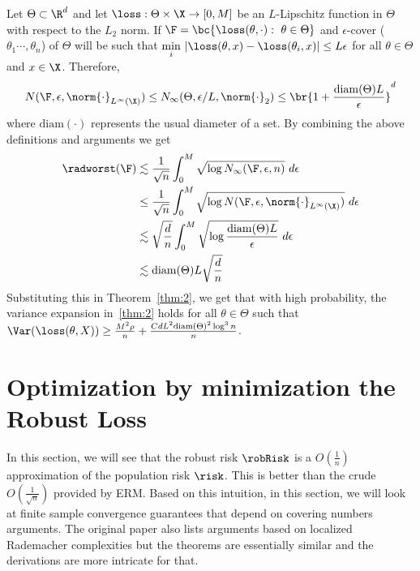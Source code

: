 \begin{example}
      Let $\Theta\subset\R^d$ and let
      $\loss:\Theta\times\X\rightarrow[0,M]$ be an $L$-Lipschitz function in
      $\Theta$ with respect to the $L_2$ norm. If
      $\F = \bc{\loss(\theta,\cdot):~\theta\in\Theta}$ and
      $\epsilon$-cover ($\theta_1\cdots,\theta_n$) of $\Theta$ will be
      such that
      $\underset{i}{\min}~|\loss(\theta, x) -
      \loss(\theta_i,x)|\le L\epsilon$ for all $\theta\in\Theta$ and
      $x\in\X$. Therefore,
      \[N(\F, \epsilon, \norm{\cdot}_{L^{\infty}(\X)} )\le
        N_{\infty}(\Theta,\epsilon/L, \norm{\cdot}_2)\le\br{1 +
          \frac{\mathrm{diam}(\Theta)L}{\epsilon}}^d\] where
      $\mathrm{diam}(\cdot)$ represents the usual diameter of a
      set. By combining the above definitions and arguments we get
      \begin{align*}
        \radworst(\F) &\lesssim
                        \frac{1}{\sqrt{n}}\int_{0}^M\sqrt{\log N_{\infty}(\F,\epsilon,n)}~d\epsilon\\
                      &\le \frac{1}{\sqrt{n}}\int_{0}^M\sqrt{\log N(\F,
                        \epsilon, \norm{\cdot}_{L^{\infty}(\X)}
                    )}~d\epsilon\\
                      &\lesssim
                        \sqrt{\frac{d}{n}} \int_{0}^M \sqrt{\log
                        \frac{\mathrm{diam} (\Theta)L}{\epsilon}}~d\epsilon\\
                      & \lesssim \mathrm{diam}(\Theta)L\sqrt{\frac{d}{n}}
      \end{align*}
      Substituting this in Theorem~\ref{thm:2}, we get that with high
      probability, the variance expansion in~\eqref{thm:2} holds for
      all $\theta\in\Theta$ such that
      $\Var(\loss(\theta, X))\ge \frac{M^2\rho}{n}+
      \frac{CdL^2\mathrm{diam}(\Theta)^2\log^3n}{n}$.
    \end{example}


\section{Optimization by minimization the Robust Loss}
\label{sec:optim-robust-loss}

In this section, we will see that the robust risk $\robRisk$ is a
$O(\frac{1}{n})$ approximation of the population risk $\risk$. This is
better than the crude $O(\frac{1}{\sqrt{n}})$ provided by ERM. Based
on this intuition, in this section, we will look at finite sample
convergence guarantees that depend on covering numbers arguments. The
original paper also lists arguments based on localized Rademacher
complexities but the theorems are essentially similar and the
derivations are more intricate for that.


